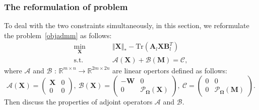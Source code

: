 \documentclass{article}
\begin{document}
{\subsubsection{The reformulation of problem }
To deal with the two constraints simultaneously, in this section, we reformulate the problem~\ref{objadmm} as follows:
\begin{equation}
    \begin{aligned}
        \underset{\mathbf X}{\min}\qquad&\quad \Vert\mathbf X \Vert_* - \text{Tr}(\mathbf A_l\mathbf X\mathbf B_l^T) \\
        \text{s.t.}\qquad&\quad   \mathcal{A}(\mathbf X) + \mathcal{B}(\mathbf M) = \mathcal{C},
    \end{aligned}\label{apobj}
\end{equation}
where $\mathcal{A}$ and $\mathcal{B}$ : $\mathbb{R}^{m\times n} \rightarrow \mathbb{R}^{2m\times 2n}$ are linear opertors defined as follows:
\begin{equation*}
    \mathcal{A}(\mathbf X) = \begin{pmatrix}
        \mathbf X & 0 \\
        0 & 0
    \end{pmatrix}, \
    \mathcal{B}(\mathbf X) = \begin{pmatrix}
        -\mathbf W & 0 \\
        0 & \mathcal{P}_{\mathbf\Omega}(\mathbf X)
    \end{pmatrix}, \ 
    \mathcal{C} = \begin{pmatrix}
        0 & 0 \\
        0 & \mathcal{P}_{\mathbf\Omega}(\mathbf M)
    \end{pmatrix}.
\end{equation*}
Then discuss the properties of adjoint operators $\mathcal{A}$ and $\mathcal{B}$.

}
\end{document}
